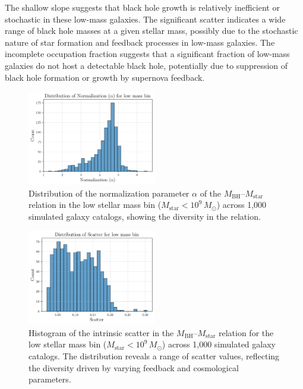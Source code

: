 \documentclass[twocolumn]{aastex631}
\begin{document}
The shallow slope suggests that black hole growth is relatively inefficient or stochastic in these low-mass galaxies. The significant scatter indicates a wide range of black hole masses at a given stellar mass, possibly due to the stochastic nature of star formation and feedback processes in low-mass galaxies. The incomplete occupation fraction suggests that a significant fraction of low-mass galaxies do not host a detectable black hole, potentially due to suppression of black hole formation or growth by supernova feedback.

\begin{figure}[ht!]
    \centering
    \includegraphics[width=0.5\textwidth]{../Project5/plots/dist_alpha_low_1_20250423_182517.png}
    \caption{Distribution of the normalization parameter $\alpha$ of the $M_\mathrm{BH}$–$M_\mathrm{star}$ relation in the low stellar mass bin ($M_\mathrm{star}<10^9\,M_\odot$) across 1,000 simulated galaxy catalogs, showing the diversity in the relation.
}
    \label{fig:dist_alpha_low}
\end{figure}

\begin{figure}[ht!]
    \centering
    \includegraphics[width=0.5\textwidth]{../Project5/plots/dist_scatter_low_2_20250423_182518.png}
    \caption{Histogram of the intrinsic scatter in the $M_\mathrm{BH}$–$M_\mathrm{star}$ relation for the low stellar mass bin ($M_\mathrm{star}<10^9\,M_\odot$) across 1,000 simulated galaxy catalogs. The distribution reveals a range of scatter values, reflecting the diversity driven by varying feedback and cosmological parameters.
}
    \label{fig:dist_scatter_low}
\end{figure}
\end{document}
